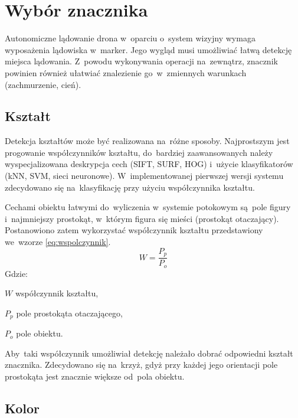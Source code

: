 

\section{Wybór znacznika} 
\label{sec:wybor_znacznika}

Autonomiczne lądowanie drona w~oparciu o~system wizyjny wymaga wyposażenia lądowiska w~marker. 
Jego wygląd musi umożliwiać łatwą detekcję miejsca lądowania. 
Z~powodu wykonywania operacji na~zewnątrz, znacznik powinien również ułatwiać znalezienie go~w~zmiennych warunkach (zachmurzenie, cień).

\subsection{Kształt}
\label{subsec:ksztalt} 
Detekcja kształtów może być realizowana na~różne sposoby. 
Najprostszym jest progowanie współczynników kształtu, do~bardziej zaawansowanych należy wyspecjalizowana deskrypcja cech (SIFT, SURF, HOG) i~użycie klasyfikatorów (kNN, SVM, sieci neuronowe). %
W~implementowanej pierwszej wersji systemu zdecydowano się na~klasyfikację przy użyciu współczynnika kształtu.

Cechami obiektu łatwymi do~wyliczenia w~systemie potokowym są~pole figury i~najmniejszy prostokąt, w~którym figura się mieści (prostokąt otaczający). 
Postanowiono zatem wykorzystać współczynnik kształtu przedstawiony we~wzorze \ref{eq:wspolczynnik}.\\
\begin{equation} \label{eq:wspolczynnik}
W=\frac{P_p}{P_o}
\end{equation}
Gdzie:
\begin{eqwhere}[2cm]
	\item[$W$] współczynnik kształtu,
	\item[$P_p$] pole prostokąta otaczającego,
	\item[$P_o$] pole obiektu.
\end{eqwhere}
Aby~taki współczynnik umożliwiał detekcję należało dobrać odpowiedni kształt znacznika. 
Zdecydowano się na~krzyż, gdyż przy każdej jego orientacji pole prostokąta jest znacznie większe od~pola obiektu.

\subsection{Kolor}
\label{subsec:kolor}

